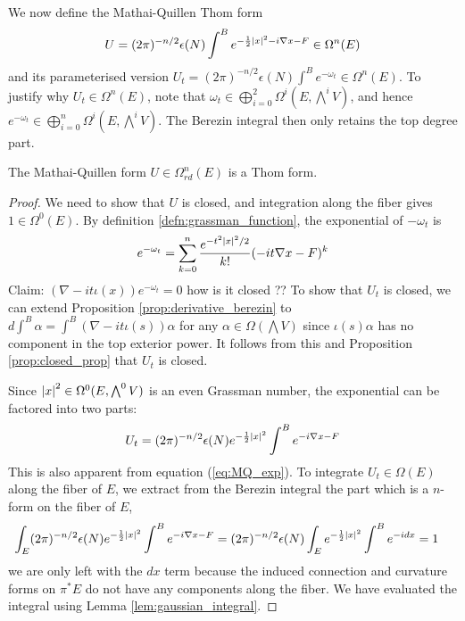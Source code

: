 We now define the Mathai-Quillen Thom form 
\begin{equation}
	U = (2\pi)^{-n/2}\epsilon(N) \int^B e^{-\frac{1}{2}\abs{x}^2-i\nabla x - F} \in \Omega^n(E)
\end{equation}
and its parameterised version $U_t = (2\pi)^{-n/2}\epsilon(N) \int^B e^{-\omega_t} \in
\Omega^n(E)$. To justify why $U_t\in\Omega^n(E)$, note that
$\omega_t\in\bigoplus_{i=0}^2 \Omega^i(E,\bigwedge^iV)$, and hence 
$e^{-\omega_t} \in \bigoplus_{i=0}^n \Omega^i(E,\bigwedge^iV)$. The Berezin
integral then only retains the top degree part. 

\begin{thm}
	The Mathai-Quillen form $U \in \Omega^n_{rd}(E)$ is a Thom form. 
\end{thm}
\begin{proof}
	We need to show that $U$ is closed, and integration along the fiber gives $1\in
	\Omega^0(E)$.
	By definition \ref{defn:grassman_function}, the exponential of $-\omega_t$
	is 
	\begin{equation} \label{eq:MQ_exp}
		e^{-\omega_t} = \sum_{k=0}^{n} \frac{e^{-t^2\abs{x}^2 /2}}{k!} (-it\nabla x
		- F)^k
	\end{equation}
	Claim: $(\nabla -it\iota(x)) e^{-\omega_t} = 0$
	how is it closed  ??
	To show that $U_t$ is closed, we can extend Proposition \ref{prop:derivative_berezin} to 
	$d\int^B\alpha = \int^B (\nabla-it\iota(s))\alpha$ for any	
	$\alpha\in\Omega(\bigwedge V)$ since $\iota(s)\alpha$ has no component in 
	the top exterior power.	
	It follows from this
	and Proposition \ref{prop:closed_prop} that $U_t$ is closed.
	
	Since $\abs{x}^2 \in \Omega^0(E,\bigwedge^0V)$ is an even Grassman number, 
	the exponential can be factored into two parts: \vspace{-3pt} 
	\[
	U_t = (2\pi)^{-n/2}\epsilon(N) e^{-\frac{1}{2}\abs{x}^2}\int^B e^{-i\nabla x -F}
	\] 
	This is also apparent from equation (\ref{eq:MQ_exp}). 
	To integrate $U_t \in \Omega(E)$ along the fiber of $E$, we extract from
	the Berezin integral the part which is a $n$-form on the fiber of $E$,
	\begin{align*}
		\int_E (2\pi)^{-n/2}\epsilon(N) e^{-\frac{1}{2}\abs{x}^2}\int^B e^{-i\nabla x -F}
		&= (2\pi)^{-n/2}\epsilon(N) \int_E e^{-\frac{1}{2}\abs{x}^2}\int^B 
		e^{-idx}
		= 1 
	\end{align*}
	we are only left with the $dx$ term because the induced connection and
	curvature forms on  $\pi^*E$ do not have any components along the fiber.
	We have evaluated the integral using Lemma \ref{lem:gaussian_integral}.
\end{proof}

